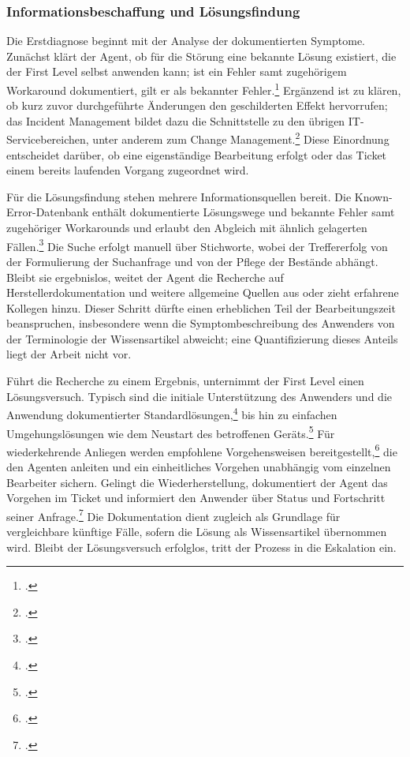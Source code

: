 \subsubsection{Informationsbeschaffung und L\"osungsfindung}
\label{loesungsfindung}

Die Erstdiagnose beginnt mit der Analyse der dokumentierten Symptome. Zun\"achst kl\"art der Agent, ob f\"ur die St\"orung eine bekannte L\"osung existiert, die der First Level selbst anwenden kann; ist ein Fehler samt zugeh\"origem Workaround dokumentiert, gilt er als bekannter Fehler.\footcites[Vgl.][S.~449]{Tiemeyer2020}[][S.~72]{Agutter2020} Erg\"anzend ist zu kl\"aren, ob kurz zuvor durchgef\"uhrte \"Anderungen den geschilderten Effekt hervorrufen; das Incident Management bildet dazu die Schnittstelle zu den \"ubrigen IT-Servicebereichen, unter anderem zum Change Management.\footcite[Vgl.][S.~448]{Tiemeyer2020} Diese Einordnung entscheidet dar\"uber, ob eine eigenst\"andige Bearbeitung erfolgt oder das Ticket einem bereits laufenden Vorgang zugeordnet wird.

F\"ur die L\"osungsfindung stehen mehrere Informationsquellen bereit. Die Known-Error-Datenbank enth\"alt dokumentierte L\"osungswege und bekannte Fehler samt zugeh\"origer Workarounds und erlaubt den Abgleich mit \"ahnlich gelagerten F\"allen.\footcite[Vgl.][S.~449]{Tiemeyer2020} Die Suche erfolgt manuell \"uber Stichworte, wobei der Treffererfolg von der Formulierung der Suchanfrage und von der Pflege der Best\"ande abh\"angt. Bleibt sie ergebnislos, weitet der Agent die Recherche auf Herstellerdokumentation und weitere allgemeine Quellen aus oder zieht erfahrene Kollegen hinzu. Dieser Schritt d\"urfte einen erheblichen Teil der Bearbeitungszeit beanspruchen, insbesondere wenn die Symptombeschreibung des Anwenders von der Terminologie der Wissensartikel abweicht; eine Quantifizierung dieses Anteils liegt der Arbeit nicht vor.

F\"uhrt die Recherche zu einem Ergebnis, unternimmt der First Level einen L\"osungsversuch. Typisch sind die initiale Unterst\"utzung des Anwenders und die Anwendung dokumentierter Standardl\"osungen,\footcite[Vgl.][S.~448]{Tiemeyer2020} bis hin zu einfachen Umgehungsl\"osungen wie dem Neustart des betroffenen Ger\"ats.\footcite[Vgl.][S.~72]{Agutter2020} F\"ur wiederkehrende Anliegen werden empfohlene Vorgehensweisen bereitgestellt,\footcite[Vgl.][S.~449]{Tiemeyer2020} die den Agenten anleiten und ein einheitliches Vorgehen unabh\"angig vom einzelnen Bearbeiter sichern. Gelingt die Wiederherstellung, dokumentiert der Agent das Vorgehen im Ticket und informiert den Anwender \"uber Status und Fortschritt seiner Anfrage.\footcite[Vgl.][S.~450]{Tiemeyer2020} Die Dokumentation dient zugleich als Grundlage f\"ur vergleichbare k\"unftige F\"alle, sofern die L\"osung als Wissensartikel \"ubernommen wird. Bleibt der L\"osungsversuch erfolglos, tritt der Prozess in die Eskalation ein.

